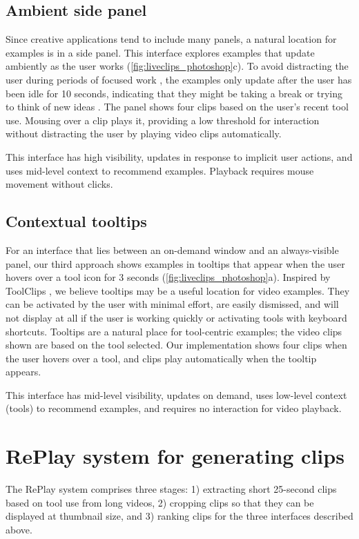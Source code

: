 \subsection{Ambient side panel}
Since creative applications tend to include many panels, a natural location for examples is in a side panel. This interface explores examples that update ambiently as the user works (\autoref{fig:liveclips_photoshop}c). To avoid distracting the user during periods of focused work \cite{Chan2017}, the examples only update after the user has been idle for 10 seconds, indicating that they might be taking a break or trying to think of new ideas \cite{Siangliulue2015}. The panel shows four clips based on the user's recent tool use. Mousing over a clip plays it, providing a low threshold for interaction without distracting the user by playing video clips automatically.

This interface has high visibility, updates in response to implicit user actions, and uses mid-level context to recommend examples. Playback requires mouse movement without clicks.

\subsection{Contextual tooltips}
For an interface that lies between an on-demand window and an always-visible panel, our third approach shows examples in tooltips that appear when the user hovers over a tool icon for 3 seconds (\autoref{fig:liveclips_photoshop}a). Inspired by ToolClips \cite{Grossman2010a}, we believe tooltips may be a useful location for video examples. They can be activated by the user with minimal effort, are easily dismissed, and will not display at all if the user is working quickly or activating tools with keyboard shortcuts.
Tooltips are a natural place for tool-centric examples; the video clips shown are based on the tool selected. Our implementation shows four clips when the user hovers over a tool, and clips play automatically when the tooltip appears.

This interface has mid-level visibility, updates on demand, uses low-level context (tools) to recommend examples, and requires no interaction for video playback. 

\section{RePlay system for generating clips}
The RePlay system comprises three stages: 1) extracting short 25-second clips based on tool use from long videos, 2) cropping clips so that they can be displayed at thumbnail size, and 3) ranking clips for the three interfaces described above. 

